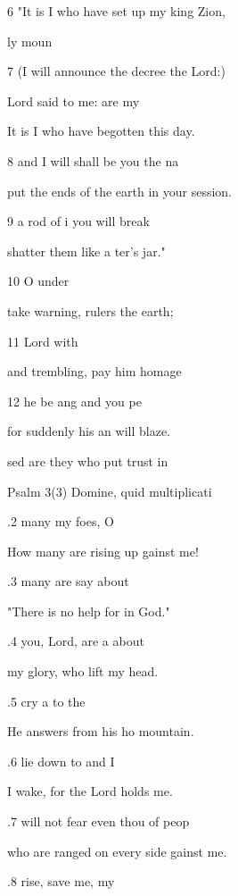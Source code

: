 6 "It is I who have set up my king  Zion, 

 ly moun 

7 (I will announce the decree  the Lord:) 

 Lord said to me:  are my  

It is I who have begotten  this day. 

8  and I will shall be you the na 

put the ends of the earth in your session. 

9  a rod of i you will break  

shatter them like a ter's jar." 

10  O  under 

take warning, rulers  the earth; 

11   Lord with  

and trembling, pay him  homage 

12  he be ang and you pe 

for suddenly his an will blaze. 

sed are they who put  trust in  

Psalm 3(3) Domine, quid multiplicati 


.2  many  my foes, O  

How many are rising up gainst me! 

.3  many are say about  

"There is no help for  in God." 

.4  you, Lord, are a  about  

my glory, who lift  my head. 

.5  cry a to the  

He answers from his ho mountain. 

.6  lie down to  and I  

I wake, for the Lord holds me. 

.7  will not fear even thou of peop 

who are ranged on every side gainst me. 

.8 rise,  save me, my  

